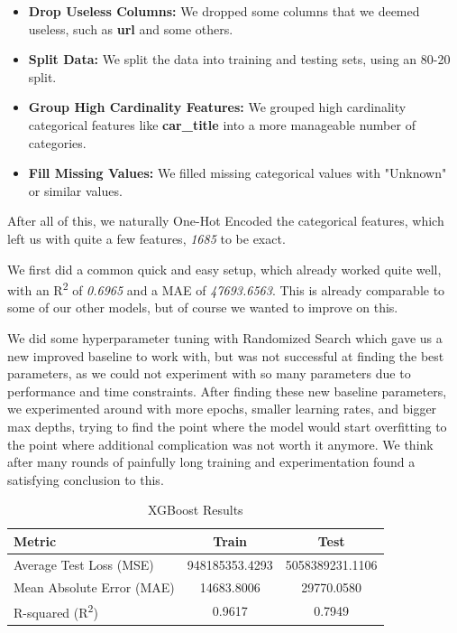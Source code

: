 \documentclass[12pt]{article}
\begin{document}
\begin{itemize}
  \item \textbf{Drop Useless Columns:} We dropped some columns that we deemed useless, such as \textbf{url} and some others.
  \item \textbf{Split Data:} We split the data into training and testing sets, using an 80-20 split.
  \item \textbf{Group High Cardinality Features:} We grouped high cardinality categorical features like \textbf{car\_title} into a more manageable number of categories.
  \item \textbf{Fill Missing Values:} We filled missing categorical values with "Unknown" or similar values.
\end{itemize}

After all of this, we naturally One-Hot Encoded the categorical features, which left us with quite a few features, \textit{1685} to be exact.

We first did a common quick and easy setup, which already worked quite well, with an R\textsuperscript{2} of \textit{0.6965} and a MAE of \textit{47693.6563}. This is already comparable to some of our other models, but of course we wanted to improve on this.

We did some hyperparameter tuning with Randomized Search which gave us a new improved baseline to work with, but was not successful at finding the best parameters, as we could not experiment with so many parameters due to performance and time constraints.
After finding these new baseline parameters, we experimented around with more epochs, smaller learning rates, and bigger max depths, trying to find the point where the model would start overfitting to the point where additional complication was not worth it anymore. We think after many rounds of painfully long training and experimentation found a satisfying conclusion to this.

\begin{table}[H]
  \centering
  \begin{tabular}{@{}lcc@{}}
    \toprule
    Metric & Train & Test \\
    \midrule
    Average Test Loss (MSE) & 948185353.4293 & 5058389231.1106 \\
    Mean Absolute Error (MAE) & 14683.8006 & 29770.0580 \\
    R-squared (R\textsuperscript{2}) & 0.9617 & 0.7949 \\
    \bottomrule
  \end{tabular}
  \caption{XGBoost Results}
  \label{tab:xgboost_results}
\end{table}
\end{document}
